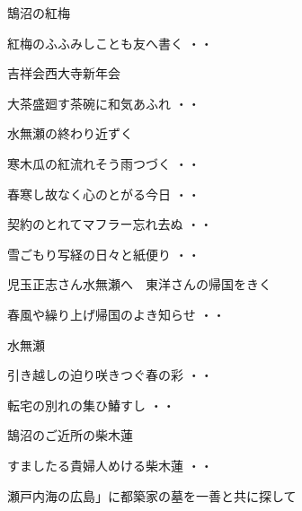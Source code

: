 \vspace{0.6cm}
鵠沼の紅梅
\begin{shiika}紅梅のふふみしことも友へ書く
\hfill{・・}\end{shiika}
\vspace{0.6cm}
吉祥会西大寺新年会
\begin{shiika}大茶盛廻す茶碗に和気あふれ
\hfill{・・}\end{shiika}
\vspace{0.6cm}
水無瀬の終わり近ずく
\begin{shiika}寒木瓜の紅流れそう雨つづく
\hfill{・・}\end{shiika}
\vspace{0.6cm}
\begin{shiika}春寒し故なく心のとがる今日
\hfill{・・}\end{shiika}
\vspace{0.6cm}
\begin{shiika}契約のとれてマフラー忘れ去ぬ
\hfill{・・}\end{shiika}
\vspace{0.6cm}
\begin{shiika}雪ごもり写経の日々と紙便り
\hfill{・・}\end{shiika}
\vspace{0.6cm}
児玉正志さん水無瀬へ　東洋さんの帰国をきく
\begin{shiika}春風や繰り上げ帰国のよき知らせ
\hfill{・・}\end{shiika}
\vspace{0.6cm}
水無瀬
\begin{shiika}引き越しの迫り咲きつぐ春の彩
\hfill{・・}\end{shiika}
\vspace{0.6cm}
\begin{shiika}転宅の別れの集ひ鰆すし
\hfill{・・}\end{shiika}
\vspace{0.6cm}
鵠沼のご近所の柴木蓮
\begin{shiika}すましたる貴婦人めける柴木蓮
\hfill{・・}\end{shiika}
\vspace{0.6cm}
瀬戸内海の広島」に都築家の墓を一善と共に探して

